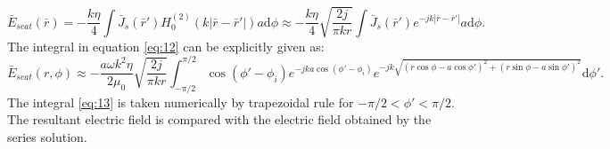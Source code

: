\documentclass[11pt]{amsart}
\begin{document}
\begin{equation}
\label{eq:12}
\bar{E}_{scat}(\bar{r})=-\frac{k \eta}{4 }\int \bar{J}_s(\bar{r}')H_{0}^{(2)}(k\left | \bar{r}-\bar{r}' \right |)a \mathrm{d} \phi \approx -\frac{k \eta}{4 }\sqrt{\frac{2j}{ \pi k r}}\int \bar{J}_s(\bar{r}') e^{-jk\left | \bar{r}-\bar{r}' \right |}a \mathrm{d} \phi.
\end{equation}
The integral in equation \ref{eq:12} can be explicitly given as:
\begin{equation}
\label{eq:13}
\bar{E}_{scat}(r,\phi) \approx -\frac{a \omega k^2 \eta }{2\mu_0 }\sqrt{\frac{2j}{ \pi k r}} \int_{-\pi/2}^{\pi/2} \cos(\phi'-\phi_i) e^{-j k a\cos (\phi'-\phi_i) }e^{-jk\sqrt{(r \cos\phi -a\cos \phi')^2+(r \sin\phi -a \sin \phi')^2}} \mathrm{d} \phi'.
\end{equation}
The integral \ref{eq:13} is taken numerically by trapezoidal rule for $-\pi/2 < \phi' < \pi/2$. The resultant electric field is compared with the electric field obtained by the series solution.
\newpage
\end{document}
